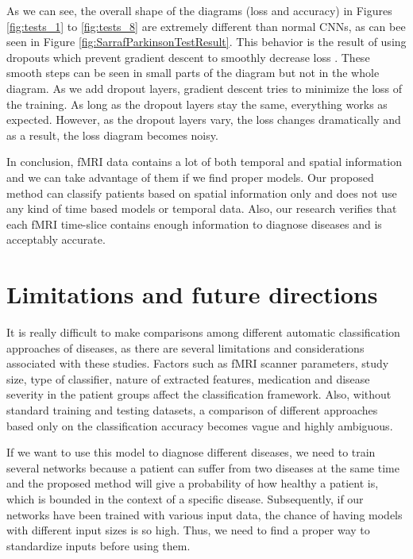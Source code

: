 \documentclass[preprint,12pt]{elsarticle}
\begin{document}
As we can see, the overall shape of the diagrams (loss and accuracy) in Figures \ref{fig:tests_1} to \ref{fig:tests_8} are extremely different than normal CNNs, as can bee seen in Figure \ref{fig:SarrafParkinsonTestResult}. This behavior is the result of using dropouts which prevent gradient descent to smoothly decrease loss \cite{Gal2016}. These smooth steps can be seen in small parts of the diagram but not in the whole diagram. As we add dropout layers, gradient descent tries to minimize the loss of the training. As long as the dropout layers stay the same, everything works as expected. However, as the dropout layers vary, the loss changes dramatically and as a result, the loss diagram becomes noisy.

In conclusion, fMRI data contains a lot of both temporal and spatial information and we can take advantage of them if we find proper models. Our proposed method can classify patients based on spatial information only and does not use any kind of time based models or temporal data. Also, our research verifies that each fMRI time-slice contains enough information to diagnose diseases and is acceptably accurate.











\section{Limitations and future directions}
\label{section:future}
It is really difficult to make comparisons among different automatic classification approaches of diseases, as there are several limitations and considerations associated with these studies. Factors such as fMRI scanner parameters, study size, type of classifier, nature of extracted features, medication and disease severity in the patient groups affect the classification framework. Also, without standard training and testing datasets, a comparison of different approaches based only on the classification accuracy becomes vague and highly ambiguous.

If we want to use this model to diagnose different diseases, we need to train several networks because a patient can suffer from two diseases at the same time and the proposed method will give a probability of how healthy a patient is, which is bounded in the context of a specific disease. Subsequently, if our networks have been trained with various input data, the chance of having models with different input sizes is so high. Thus, we need to find a proper way to standardize inputs before using them.
\end{document}
